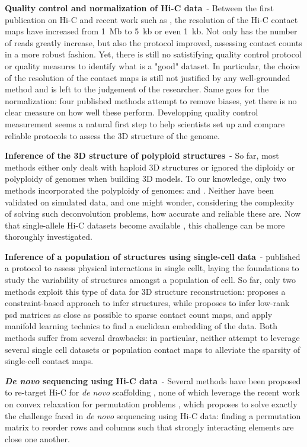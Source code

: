 \textbf{Quality control and normalization of Hi-C data}\ -
Between the first publication on Hi-C \citep{lieberman-aiden:comprehensive}
and recent work such as \citet{rao:3d, jin:high-resolution}, the resolution of
the Hi-C contact maps have increased from 1~Mb to 5~kb or even 1~kb. Not only
has the number of reads greatly increase, but also the protocol improved,
assessing contact counts in a more robust fashion. Yet, there is still no
satistifying quality control protocol or quality measures to identify what is
a "good" dataset. In particular, the choice of the resolution of the contact
maps is still not justified by any well-grounded method and is left to the
judgement of the researcher. Same goes for the normalization: four published
methods attempt to remove biases, yet there is no clear measure on how well
these perform. Developping quality control measurement seems a natural first
step to help scientists set up and compare reliable protocols to assess the 3D
structure of the genome.

\textbf{Inference of the 3D structure of polyploid structures}\ - So far, most
methods either only dealt with haploid 3D structures or ignored the diploidy
or polyploidy of genomes when building 3D models. To our knowledge, only two
methods incorporated the polyploidy of genomes: \citet{kalhor:genome} and
\citet{ay:identifying}. Neither have been validated on simulated data, and
one might wonder, considering the complexity of solving such deconvolution
problems, how accurate and reliable these are. Now that single-allele Hi-C
datasets become available \citep{deng:bipartite}, this challenge can be more
thoroughly investigated.

\textbf{Inference of a population of structures using single-cell data}\ -
\citet{nagano:single-cell} published a protocol to assess physical
interactions in single cellt, laying the foundations to study the variability
of structures amongst a population of cell. So far, only two methods exploit
this type of data for 3D structure reconstruction: \citet{nagano:single-cell}
proposes a constraint-based approach to infer structures, while
\citet{paulsen:manifold} proposes to infer low-rank psd matrices as close as
possible to sparse contact count maps, and apply manifold learning technics to
find a euclidean embedding of the data. Both methods suffer from several
drawbacks: in particular, neither attempt to leverage several single cell
datasets or population contact maps to alleviate the sparsity of single-cell
contact maps.

\textbf{\textit{De novo} sequencing using Hi-C data}\ - Several methods have
been proposed to re-target Hi-C for \textit{de novo} scaffolding
\citep{burton:chromosome, kaplan:high-throughput, marie-nelly:high-quality},
none of which leverage the recent work on convex relaxation for permutation
problems \citet{fogel:convex}, which proposes to solve exactly the challenge
faced in \textit{de novo} sequencing using Hi-C data: finding a permutation
matrix to reorder rows and columns such that strongly interacting elements are
close one another.

